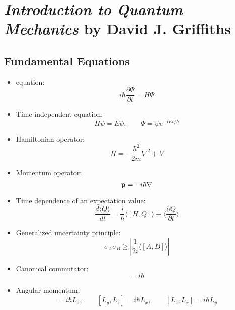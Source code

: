 \chapter{\emph{Introduction to Quantum Mechanics} by David J. Griffiths}

\section{Fundamental Equations}
\begin{itemize}
	\item \sch equation:
	\begin{equation}
	i \hbar \frac{\partial \Psi}{\partial t} = H \Psi
	\end{equation}

	\item Time-independent \sch equation:
	\begin{equation}
	H \psi = E \psi, \qquad \Psi = \psi e^{-iEt/\hbar}
	\end{equation}

	\item Hamiltonian operator:
	\begin{equation}
	H= - \frac{\hbar^2}{2m} \nabla^2 + V
	\end{equation}

	\item Momentum operator:
	\begin{equation}
	\textbf{p} = - i \hbar \nabla
	\end{equation}

	\item Time dependence of an expectation value:
	\begin{equation}
	\frac{d \langle Q \rangle }{dt} = \frac{i}{\hbar}\langle[H,Q]\rangle + \langle \frac{\partial Q}{\partial t} \rangle
	\end{equation}

	\item Generalized uncertainty principle:
	\begin{equation}
	\sigma_A \sigma_B \geqslant |\frac{1}{2 i }\langle[A,B]\rangle|
	\end{equation}

	\item Canonical commutator:
	\begin{equation}
	[x,p] = i \hbar
	\end{equation}

	\item Angular momentum:
	\begin{equation}
	[L_x,L_y]=i\hbar L_z, \qquad [L_y,L_z]=i\hbar L_x, \qquad [L_z,L_x]=i\hbar L_y
	\end{equation}


\end{itemize}
